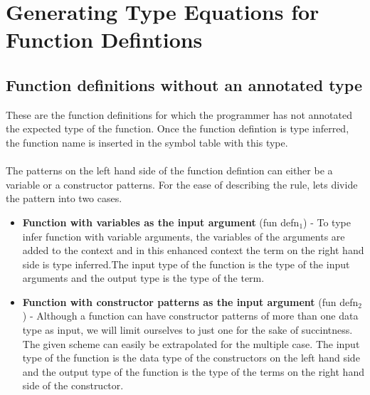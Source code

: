 \documentclass[11pt]{article}
\begin{document}
\section {Generating Type Equations for Function Defintions}

\subsection {Function definitions without an annotated type}
These are the function definitions for which the programmer has not annotated the expected type of the function. Once the function defintion is type inferred, the function name is inserted in the symbol table with this type. 
~~\\~~\\
The patterns on the left hand side of the function defintion can either be a variable or a constructor patterns. For the ease of describing the rule, lets divide the pattern into two cases.
\begin {itemize}
  \item {\bf Function with variables as the input argument} ({\sf fun defn$_1$)} -
To type infer function with variable arguments, the variables of the arguments are added to the context and in this enhanced context the term on the right hand side is type inferred.The input type of the function is the type of the input arguments and the output type is the type of the term.   
  \item {\bf Function with constructor patterns as the input argument} ({\sf fun defn$_2$)} - Although a function can have constructor patterns of more than one data type as input, we will limit ourselves to just one for the sake of succintness. The given scheme can easily be extrapolated for the multiple case. The input type of the function is the data type of the constructors on the left hand side and the output type of the function is the type of the terms on the right hand side of the constructor. 
\end {itemize} 
\end{document}
